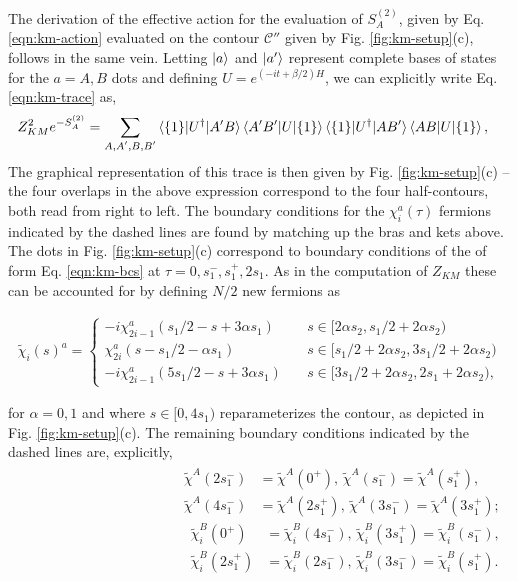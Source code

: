 \documentclass[reprint, floatfix,eqsecnum,superscriptaddress,preprint,nofootinbib,onecolumn,amsmath,amssymb,aps,prb]{revtex4-2}
\newcommand{\tchi}{\tilde{\chi}}
\begin{document}
The derivation of the effective action for the evaluation of $S^{(2)}_A$, given by Eq. \eqref{eqn:km-action} evaluated on the contour $\mathcal{C}''$ given by Fig. \ref{fig:km-setup}(c), follows in the same vein. Letting $\ket{a}$ and $\ket{a'}$ represent complete bases of states for the $a=A,B$ dots and defining $U = e^{(-it+\beta/2)H}$, we can explicitly write Eq. \eqref{eqn:km-trace} as, 
\begin{align}
    \begin{split}
    Z_{KM}^2 e^{-S^{(2)}_A} =  \sum_{\substack{A,A' , B,B'}} & \braket{\{1\}|U^\dagger |A' B} \braket{A' B'|U|\{1\}} \braket{\{1\}|U^\dagger |A B'} \braket{A B|U|\{1\}} ,
    \end{split}
\end{align}
The graphical representation of this trace is then given by Fig. \ref{fig:km-setup}(c) -- the four overlaps in the above expression correspond to the four half-contours, both read from right to left. The boundary conditions for the $\chi_i^a(\tau)$ fermions indicated by the dashed lines are found by matching up the bras and kets above. The dots in Fig. \ref{fig:km-setup}(c) correspond to boundary conditions of the of form Eq. \eqref{eqn:km-bcs} at $\tau=0,s_1^-,s_1^+, 2s_1$. As in the computation of $Z_{KM}$ these can be accounted for by defining $N/2$ new fermions as
\begin{widetext}
\begin{align}
	\tchi_i(s)^a = \begin{cases}
	    -i\chi_{2i-1}^a(s_1/2 - s +3\alpha s_1) \quad & s \in [2\alpha s_2 , s_1/2 + 2\alpha s_2) \\
		\chi_{2i}^a(s-s_1 / 2  - \alpha s_1) \quad & s \in [s_1/2 + 2\alpha s_2,3s_1/2 + 2\alpha s_2) \\
		-i\chi_{2i-1}^a(5s_1/2 - s +3\alpha s_1) \quad & s \in [3s_1/2 + 2\alpha s_2 , 2s_1 + 2\alpha s_2),
	\end{cases}
\end{align}
\end{widetext}
for $\alpha=0,1$ and where $s \in [0,4s_1)$ reparameterizes the contour, as depicted in Fig. \ref{fig:km-setup}(c). The remaining boundary conditions indicated by the dashed lines are, explicitly,
\begin{align}
\begin{split}
    \tchi^A(2s_1^-) &= \tchi^A(0^+), \, \tchi^A(s_1^-) = \tchi^A(s_1^+), \\
    \tchi^A(4s_1^-) &= \tchi^A(2s_1^+), \, \tchi^A(3s_1^-) = \tchi^A(3s_1^+);
    \end{split}
    \begin{split}
    \tchi^B_i(0^+) &= \tchi^B_i(4s_1^-), \, \tchi^B_i(3s_1^+) = \tchi^B_i(s_1^-), \\
    \tchi^B_i(2s_1^+) &= \tchi^B_i(2s_1^-), \, \tchi^B_i(3s_1^-) = \tchi^B_i(s_1^+).
    \end{split}
\end{align}
\end{document}
